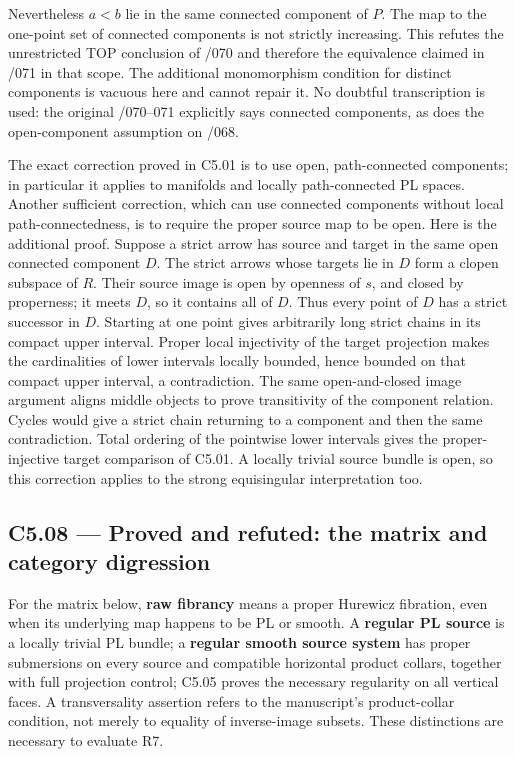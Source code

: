 Nevertheless \(a<b\) lie in the same connected component of \(P\). The map to the one-point set of connected components is not strictly increasing. This refutes the unrestricted TOP conclusion of /070 and therefore the equivalence claimed in /071 in that scope. The additional monomorphism condition for distinct components is vacuous here and cannot repair it. No doubtful transcription is used: the original /070--071 explicitly says connected components, as does the open-component assumption on /068.

The exact correction proved in C5.01 is to use open, path-connected components; in particular it applies to manifolds and locally path-connected PL spaces. Another sufficient correction, which can use connected components without local path-connectedness, is to require the proper source map to be open. Here is the additional proof. Suppose a strict arrow has source and target in the same open connected component \(D\). The strict arrows whose targets lie in \(D\) form a clopen subspace of \(R\). Their source image is open by openness of \(s\), and closed by properness; it meets \(D\), so it contains all of \(D\). Thus every point of \(D\) has a strict successor in \(D\). Starting at one point gives arbitrarily long strict chains in its compact upper interval. Proper local injectivity of the target projection makes the cardinalities of lower intervals locally bounded, hence bounded on that compact upper interval, a contradiction. The same open-and-closed image argument aligns middle objects to prove transitivity of the component relation. Cycles would give a strict chain returning to a component and then the same contradiction. Total ordering of the pointwise lower intervals gives the proper-injective target comparison of C5.01. A locally trivial source bundle is open, so this correction applies to the strong equisingular interpretation too.

\subsection{C5.08 --- Proved and refuted: the matrix and category digression}\label{c5.08-proved-and-refuted-the-matrix-and-category-digression}

For the matrix below, \textbf{raw fibrancy} means a proper Hurewicz fibration, even when its underlying map happens to be PL or smooth. A \textbf{regular PL source} is a locally trivial PL bundle; a \textbf{regular smooth source system} has proper submersions on every source and compatible horizontal product collars, together with full projection control; C5.05 proves the necessary regularity on all vertical faces. A transversality assertion refers to the manuscript's product-collar condition, not merely to equality of inverse-image subsets. These distinctions are necessary to evaluate R7.

